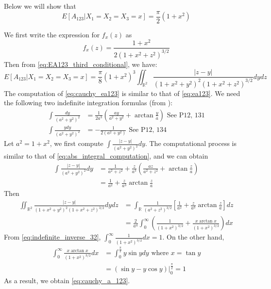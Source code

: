 \documentclass{article}
\def\R{\mathbb{R}}
\begin{document}
Below we will show that
\begin{equation}\label{eq:cauchy_a_123}
E[A_{123}|X_1=X_2=X_3=x] = \frac{\pi}{2}(1+x^2)
\end{equation}

We first write the expression for $f_x(z)$
as
$$
f_x(z) = \frac{1+x^2}{2(1+x^2+z^2)^{3/2}}
$$
Then from \eqref{eq:EA123_third_conditional},
we have:
\begin{equation}\label{eq:cauchy_ea123}
    E[A_{123}|X_1=X_2=X_3=x]
    = \frac{\pi}{8} (1+x^2)^3
    \iint_{\R^2} \frac{|z-y|}{(1+x^2+y^2)^2
    (1+x^2+z^2)^{3/2}}dydz
\end{equation}
The computation of 
\eqref{eq:cauchy_ea123} is similar to that of \eqref{eq:ea123}. We need the following two indefinite integration formulas (from \cite{integration}):
\begin{align}
\int \frac{dy}{(a^2+y^2)^2}
& = \frac{1}{2a^3} \left( 
    \frac{ay}{a^2 + y^2} + \arctan \frac{y}{a}
\right)  \textrm{ See P12, 131}  \\
\int \frac{ydy}{(a^2+y^2)^2}
& = -\frac{1}{2(a^2+y^2)}
\textrm{ See P12, 134}
\end{align}
Let $a^2=1+x^2$, we first compute
$\int \frac{|z-y|}{(a^2+y^2)^2}dy$.
The computational process is similar to that of
\eqref{eq:abs_integral_computation},
and we can obtain
\begin{align*}
\int \frac{|z-y|}{(a^2+y^2)^2}dy
&= \frac{1}{a^2 + z^2}
+ \frac{z}{a^3}
\left(
    \frac{az}{a^2+z^2}
    + \arctan \frac{z}{a}
\right)\\
&= \frac{1}{a^2} + \frac{z}{a^3}\arctan\frac{z}{a}
\end{align*}
Then
\begin{align*}
    \iint_{\R^2} \frac{|z-y|}{(1+x^2+y^2)^2
    (1+x^2+z^2)^{3/2}}dydz
    & = \int_{\R} \frac{1}{(a^2+z^2)^{3/2}}\left[\frac{1}{a^2} + \frac{z}{a^3}\arctan\frac{z}{a}\right] dz \\
    &=\frac{2}{a^4}\int_0^{\infty}
    \left(
        \frac{1}{(1+x^2)^{3/2}}
        + \frac{x\arctan x}{(1+x^2)^{3/2}}
    \right)
    dx
\end{align*}
From \eqref{eq:indefinite_inverse_32},
$\int_0^{\infty} \frac{1}{(1+x^2)^{3/2}}dx
= 1
$. On the other hand,
\begin{align*}
    \int_0^{\infty}
    \frac{x\arctan x}{(1+x^2)^{3/2}}dx
    & = \int_0^{\frac{\pi}{2}} y \sin y dy
    \textrm{ where } x = \tan y \\
    & = (\sin y - y \cos y)\Big\vert_0^{\frac{\pi}{2}} = 1
\end{align*}
As a result, we obtain \eqref{eq:cauchy_a_123}.
\end{document}
